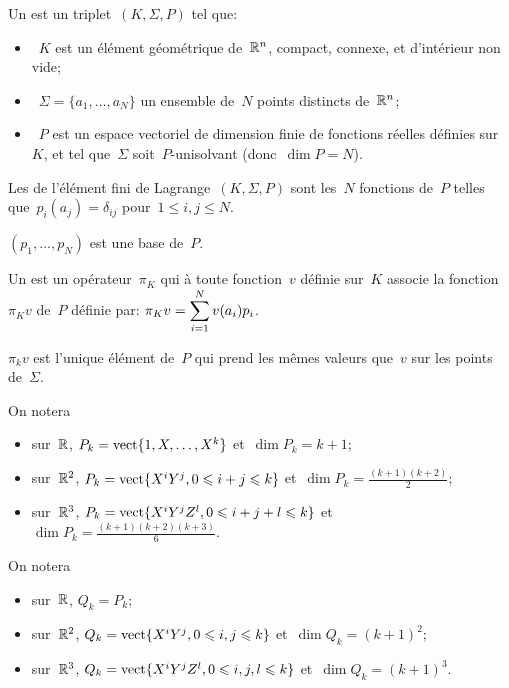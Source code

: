 \begin{definition}
Un  est un triplet~$(K, \Sigma, P)$ tel que:
\begin{itemize}
\item~$K$ est un élément géométrique de~$\mathbb R^n$, compact, connexe, et d'intérieur
	non vide;
\item~$\Sigma=\{a_1,\ldots, a_N\}$ un ensemble de~$N$ points distincts de~$\mathbb R^n$;
\item~$P$ est un espace vectoriel de dimension finie de fonctions réelles définies sur~$K$, et tel
	que~$\Sigma$ soit~$P$-unisolvant (donc~$\dim P = N$).
\end{itemize}
\end{definition}
\medskip
Les  de l'élément fini de Lagrange~$(K, \Sigma, P)$ sont les~$N$ fonctions de~$P$ telles que~$p_i(a_j)=\delta_{ij}$ pour~$1\le i,j\le N$.
\medskip
\begin{remarque}$(p_1,\ldots, p_N)$ est une base de~$P$.\end{remarque}
\medskip
\begin{definition}
Un  est un opérateur~$\pi_K$ qui à toute fonction~$v$ définie sur~$K$ associe la fonction~$\pi_Kv$ de~$P$ définie par: $\pi_Kv=\displaystyle\sum_{i=1}^N v(a_i)p_i$.
\end{definition}
\begin{theoreme}
$\pi_kv$ est l'unique élément de~$P$ qui prend les mêmes valeurs que~$v$ sur les points de~$\Sigma$.
\end{theoreme}
\medskip
On notera 
\begin{itemize}
\item sur~$\mathbb R$, $P_k=\operatorname{vect}\{1, X,\ldots, X^k\}$ et~$\dim P_k=k+1$;
\item sur~$\mathbb R^2$, $P_k=\operatorname{vect}\{X^iY^j, 0\leqslant i+j\leqslant k\}$ et~$\dim P_k=\frac{(k+1)(k+2)}2$;
\item sur~$\mathbb R^3$, $P_k=\operatorname{vect}\{X^iY^jZ^l, 0\leqslant i+j+l\leqslant k\}$ et~$\dim P_k=\frac{(k+1)(k+2)(k+3)}6$.
\end{itemize}
\medskip
On notera 
\begin{itemize}
\item sur~$\mathbb R$, $Q_k=P_k$;
\item sur~$\mathbb R^2$, $Q_k=\operatorname{vect}\{X^iY^j, 0\leqslant i,j\leqslant k\}$ et~$\dim Q_k=(k+1)^2$;
\item sur~$\mathbb R^3$, $Q_k=\operatorname{vect}\{X^iY^jZ^l, 0\leqslant i,j,l\leqslant k\}$ et~$\dim Q_k=(k+1)^3$.
\end{itemize}



